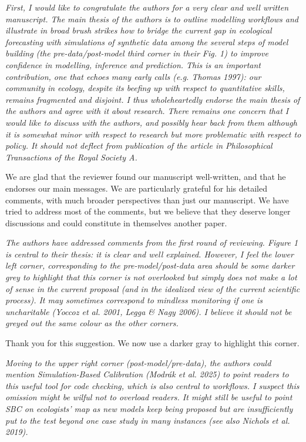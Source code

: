 \documentclass[11pt,letter]{article}
\begin{document}
\begin{mybox}
\emph{First, I would like to congratulate the authors for a very clear and well written manuscript. The main thesis of the authors is to outline modelling workflows and illustrate in broad brush strikes how to bridge the current gap in ecological forecasting with simulations of synthetic data among the several steps of model building (the pre-data/post-model third corner in their Fig. 1) to improve confidence in modelling, inference and prediction. This is an important contribution, one that echoes many early calls (e.g. Thomas 1997): our community in ecology, despite its beefing up with respect to quantitative skills, remains fragmented and disjoint. I thus wholeheartedly endorse the main thesis of the authors and agree with it about research. There remains one concern that I would like to discuss with the authors, and possibly hear back from them although it is somewhat minor with respect to research but more problematic with respect to policy. It should not deflect from publication of the article in Philosophical Transactions of the Royal Society A.}
\end{mybox}

We are glad that the reviewer found our manuscript well-written, and that he endorses our main messages. We are particularly grateful for his detailed comments, with much broader perspectives than just our manuscript. We have tried to address most of the comments, but we believe that they deserve longer discussions and could constitute in themselves another paper.

\begin{mybox}
\emph{The authors have addressed comments from the first round of reviewing. Figure 1 is central to their thesis: it is clear and well explained. However, I feel the lower left corner, corresponding to the pre-model/post-data area should be some darker grey to highlight that this corner is not overlooked but simply does not make a lot of sense in the current proposal (and in the idealized view of the current scientific process). It may sometimes correspond to mindless monitoring if one is uncharitable (Yoccoz et al. 2001, Legga \& Nagy 2006). I believe it should not be greyed out the same colour as the other corners.}  
\end{mybox}

Thank you for this suggestion. We now use a darker gray to highlight this corner.

\begin{mybox}
\emph{Moving to the upper right corner (post-model/pre-data), the authors could mention
Simulation-Based Calibration (Modrák et al. 2025) to point readers to this useful tool for code
checking, which is also central to workflows. I suspect this omission might be wilful not to
overload readers. It might still be useful to point SBC on ecologists’ map as new models keep
being proposed but are insufficiently put to the test beyond one case study in many instances
(see also Nichols et al. 2019).}  
\end{mybox}
\end{document}
